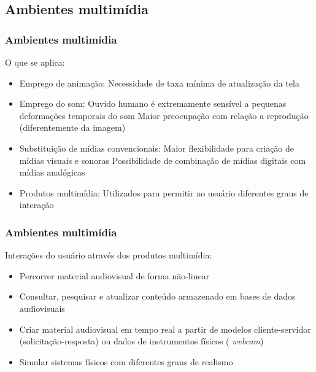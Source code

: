 \documentclass[xcolor]{beamer}
\begin{document}
\subsection{Ambientes multimídia}
\begin{frame}
    \frametitle{Ambientes multimídia}

    O que se aplica:

    \begin{itemize}
        \item Emprego de animação: Necessidade de taxa mínima de atualização da
tela
        \item Emprego do som: Ouvido humano é extremamente sensível a
pequenas deformações temporais do som \implica Maior preocupação com relação a
reprodução (diferentemente da imagem)
        \item Substituição de mídias convencionais: Maior flexibilidade
para criação de mídias visuais e sonoras \implica Possibilidade de combinação de
mídias digitais com mídias analógicas
        \item Produtos multimídia: Utilizados para permitir ao usuário
diferentes graus de interação
    \end{itemize}
\end{frame}

\begin{frame}
    \frametitle{Ambientes multimídia}

    Interações do usuário através dos produtos multimídia:

    \begin{itemize}
        \item Percorrer material audiovisual de forma não-linear
        \item Consultar, pesquisar e atualizar conteúdo armazenado em bases de
dados audiovisuais
        \item Criar material audiovisual em tempo real a partir de modelos
cliente-servidor (solicitação-resposta) ou dados de instrumentos físicos ({\it
webcam})
        \item Simular sistemas físicos com diferentes graus de realismo
    \end{itemize}
\end{frame}
\end{document}
